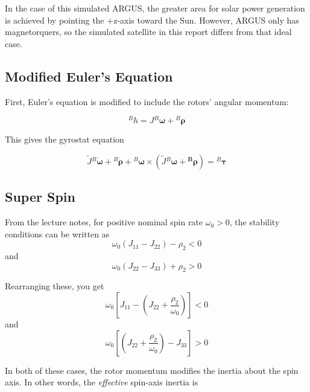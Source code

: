 \documentclass[conference,onecolumn,draftclsnofoot]{IEEEtran}
\begin{document}
In the case of this simulated ARGUS, the greater area for solar power generation is achieved by pointing the +z-axis toward the Sun. However, ARGUS only has magnetorquers, so the simulated satellite in this report differs from that ideal case.

\subsection{Modified Euler's Equation}

First, Euler's equation is modified to include the rotors' angular momentum:

\begin{equation}
\mathbf {}^Bh
= J{}^B\boldsymbol{\omega}
+
{}^B\boldsymbol{\rho}
\end{equation}

This gives the gyrostat equation

\begin{equation}
\tilde J{}^B\dot{\boldsymbol{\omega}}
+
{}^B\dot{\boldsymbol{\rho}}
+
{}^B\boldsymbol{\omega}\times
\left(
\tilde J{}^B\boldsymbol{\omega}
+
\boldsymbol{{}^B\rho}
\right)
=
{}^B\boldsymbol{\tau}
\end{equation}

\subsection{Super Spin}

From the lecture notes, for positive nominal spin rate $\omega_0>0$, the stability
conditions can be written as
\begin{equation}
\omega_0(J_{11}-J_{22})-\rho_2 < 0
\end{equation}
and
\begin{equation}
\omega_0(J_{22}-J_{33})+\rho_2 > 0
\end{equation}

Rearranging these, you get
\begin{equation}
\omega_0
\left[
J_{11}
-
\left(
J_{22}+\frac{\rho_2}{\omega_0}
\right)
\right]
<0
\end{equation}
and
\begin{equation}
\omega_0
\left[
\left(
J_{22}+\frac{\rho_2}{\omega_0}
\right)
-
J_{33}
\right]
>0
\end{equation}

In both of these cases, the rotor momentum modifies the inertia about the spin axis. In other words, the \textit{effective} spin-axis inertia is
\end{document}
